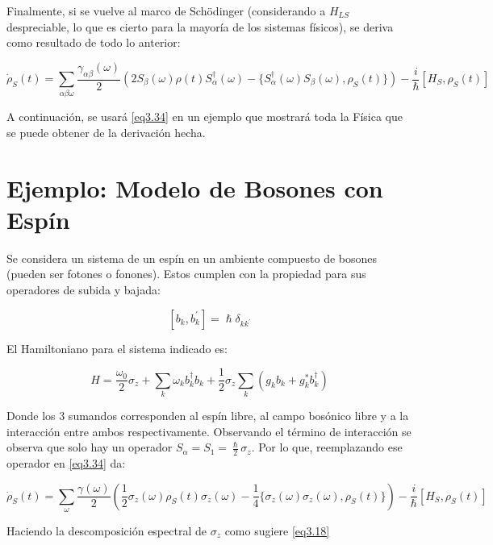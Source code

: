 \documentclass{book}
\begin{document}
Finalmente, si se vuelve al marco de Sch\"odinger (considerando a $H_{LS}$ despreciable, lo que es cierto para la mayoría de los sistemas físicos), se deriva como resultado de todo lo anterior:

\begin{equation}\label{eq3.34}\dot{\rho}_S(t)=\sum_{\alpha\beta\omega} \frac{\gamma_{\alpha\beta}(\omega)}{2}(2S_\beta(\omega)\rho(t)S_\alpha^\dag (\omega)-\{S_\alpha^\dag(\omega)S_\beta(\omega),\rho_S(t)\})-\frac{i}{\hslash}[H_{S},\rho_S(t)]\end{equation}

A continuación, se usará \ref{eq3.34} en un ejemplo que mostrará toda la Física que se puede obtener de la derivación hecha.

\section{Ejemplo: Modelo de Bosones con Espín}

Se considera un sistema de un espín en un ambiente compuesto de bosones (pueden ser fotones o fonones). Estos cumplen con la propiedad para sus operadores de subida y bajada:

\begin{equation}\label{eq3.35}[b_k,b_k^\prime]=\hslash\delta_{kk^\prime}\end{equation}

El Hamiltoniano para el sistema indicado es:

\begin{equation}\label{eq3.36}H=\frac{\omega_0}{2}\sigma_z+\sum_k\omega_k b^\dag_k b_k+\frac{1}{2}\sigma_z\sum_k(g_kb_k+g_k^*b_k^\dag)\end{equation}

Donde los 3 sumandos corresponden al espín libre, al campo bosónico libre y a la interacción entre ambos respectivamente. Observando el término de interacción se observa que solo hay un operador $S_\alpha=S_1=\frac{\hslash}{2}\sigma_z$. Por lo que, reemplazando ese operador en \ref{eq3.34} da:

\begin{equation}\label{eq3.37}\dot{\rho}_S(t)=\sum_\omega \frac{\gamma(\omega)}{2}(\frac{1}{2}\sigma_z(\omega)\rho_S(t)\sigma_z(\omega)-\frac{1}{4}\{\sigma_z(\omega)\sigma_z(\omega),\rho_S(t)\})-\frac{i}{\hslash}[H_S,\rho_S(t)]\end{equation}

Haciendo la descomposición espectral de $\sigma_z$ como sugiere \ref{eq3.18}
\end{document}
